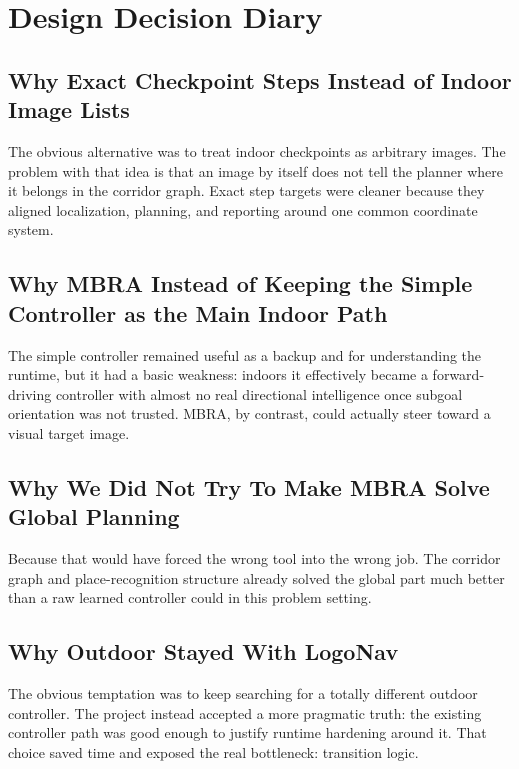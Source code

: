 \documentclass[11pt]{article}
\begin{document}
\section{Design Decision Diary}

\subsection{Why Exact Checkpoint Steps Instead of Indoor Image Lists}

The obvious alternative was to treat indoor checkpoints as arbitrary images. The
problem with that idea is that an image by itself does not tell the planner where it
belongs in the corridor graph. Exact step targets were cleaner because they aligned
localization, planning, and reporting around one common coordinate system.

\subsection{Why MBRA Instead of Keeping the Simple Controller as the Main Indoor Path}

The simple controller remained useful as a backup and for understanding the runtime,
but it had a basic weakness: indoors it effectively became a forward-driving
controller with almost no real directional intelligence once subgoal orientation was
not trusted. MBRA, by contrast, could actually steer toward a visual target image.

\subsection{Why We Did Not Try To Make MBRA Solve Global Planning}

Because that would have forced the wrong tool into the wrong job. The corridor graph
and place-recognition structure already solved the global part much better than a
raw learned controller could in this problem setting.

\subsection{Why Outdoor Stayed With LogoNav}

The obvious temptation was to keep searching for a totally different outdoor
controller. The project instead accepted a more pragmatic truth: the existing
controller path was good enough to justify runtime hardening around it. That choice
saved time and exposed the real bottleneck: transition logic.
\end{document}
